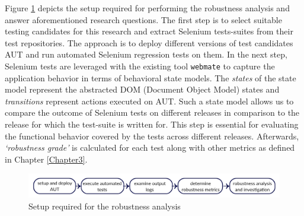 
Figure \ref{fig:thesisoverview} depicts the setup required for performing the robustness analysis and answer aforementioned research questions. 
The first step is to select suitable testing candidates for this research and extract Selenium tests-suites from their test repositories. The approach is to deploy different versions of test candidates AUT and run automated Selenium regression tests on them. In the next step, Selenium tests are leveraged with the existing tool \texttt{webmate} \cite{webmate} to capture the application behavior in terms of behavioral state models. The \textit{states} of the state model represent the abstracted DOM (Document Object Model) states and \textit{transitions} represent actions executed on AUT. Such a state model allows us to compare the outcome of Selenium tests on different releases in comparison to the release for which the test-suite is written for. This step is essential for evaluating the functional behavior covered by the tests across different releases. Afterwards, \textit{`robustness grade'} is calculated for each test along with other metrics as defined in Chapter \ref{Chapter3}.\newline

\begin{figure}[h]
	\centering	\includegraphics[width=\textwidth]{./Figures/thesisoverviewsmall.jpg}
	\caption{Setup required for the robustness analysis}
	\label{fig:thesisoverview}
\end{figure} 

